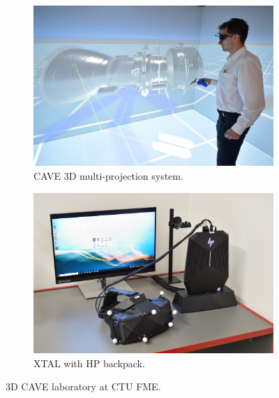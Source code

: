 \begin{figure}[!ht]\centering
    \begin{subfigure}[b]{0.48\textwidth}
        \centering
        \includegraphics[width=\textwidth]{img/cave-projection.jpg}
        \caption{CAVE 3D multi-projection system.}
        \label{fig:cave-proj}
    \end{subfigure}
    \hfill
    \begin{subfigure}[b]{0.48\textwidth}
        \centering
        \includegraphics[width=\textwidth]{img/cave-xtal.jpg}
        \caption{XTAL with HP backpack.}
        \label{fig:cave-xtal}
    \end{subfigure}
    \caption[3D CAVE laboratory at CTU FME.]{3D CAVE laboratory at CTU FME.~\cite{cave-lab}}
\end{figure}


